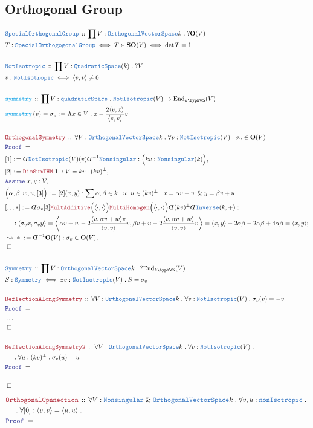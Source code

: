 \documentclass[12pt]{scrartcl}%
\newcommand{\TYPE}[1]{\textcolor{NavyBlue}{\mathtt{#1}}}%
\newcommand{\FUNC}[1]{\textcolor{Cerulean}{\mathtt{#1}}}%
\newcommand{\LOGIC}[1]{\textcolor{Blue}{\mathtt{#1}}}%
\newcommand{\THM}[1]{\textcolor{Maroon}{\mathtt{#1}}}%
\renewcommand{\.}{\; . \;} %
\newcommand{\de}{: \kern 0.1pc =} %
\newcommand{\Act}[1]{\left( #1 \right)} %
\newcommand{\Theorem}[2]{& \THM{#1} \, :: \, #2 \\ & \Proof = \\ } %
\newcommand{\DeclareType}[2]{& \TYPE{#1} \, :: \, #2 \\}%
\newcommand{\DefineType}[3]{& #1 : \TYPE{#2} \iff #3 \\}%
\newcommand{\DefineNamedType}[4]{& #1 : \TYPE{#2} \iff #3 \iff #4 \\}%
\newcommand{\DeclareFunc}[2]{& \FUNC{#1} \, :: \, #2 \\}%
\newcommand{\DefineNamedFunc}[4]{&  \FUNC{#1}\Act{#2} = #3 \de #4 \\}%
\newcommand{\NewLine}{\\ & \kern 1pc}%
\newcommand{\Page}[1]{ \begin{align*} #1 \end{align*}  }%
\newcommand{ \bd }{ \ByDef }%
\newcommand{\NoProof}{ & \ldots \\ \EndProof}%
\renewcommand{\And}{\; \& \;}%
\newcommand{\End}{\mathrm{End}}%
\newcommand{\Say}[3]{& #1 \de #2 : #3, \\} %
\newcommand{\Conclude}[3]{& #1 \de #2 : #3; \\}%
\newcommand{\Derive}[3]{& \leadsto #1 \de #2 : #3, \\} %
\newcommand{\Assume}[2]{& \LOGIC{Assume} \; #1 : #2, \\} %
\newcommand{\QED}{\; \square} %
\newcommand{\EndProof}{& \QED \\} %
\newcommand{\ByDef}{\rotatebox[origin=c]{-180}{$D$}}%
\newcommand{\Proof}{\LOGIC{Proof} \; } %
\newcommand{\SO}{\mathbf{SO}}
\newcommand{\OVS}{\TYPE{OrthogonalVectorSpace}}
\newcommand{\VS}[1]{#1\hyph\mathsf{VS}} %
\renewcommand{\O}{\mathbf{O}}
\begin{document}
\subsection{Orthogonal Group}
\Page{
	\DeclareType{SpecialOrthogonalGroup}{ \prod V : \OVS{k} \.  ?\O(V)  }
	\DefineNamedType{T}{SpecialOrthogogonalGroup}{T \in \SO(V)}{\det T = 1} 
	\\
	\DeclareType{NotIsotropic}{\prod V : \TYPE{QuadraticSpace}(k) \. ?V}
	\DefineType{v}{NotIsotropic}{ \langle v, v \rangle \neq 0  }
	\\
	\DeclareFunc{symmetry}{\prod V : \TYPE{quadraticSpace} \. \TYPE{NotIsotropic}(V) \to \End_{\VS{k}}(V)}
	\DefineNamedFunc{symmetry}{v}{\sigma_v}{\Lambda x \in V \. x -  \frac{2\langle v,x \rangle}{\langle v,v\rangle}v}
	\\
	\Theorem{OrthogonalSymmetry}{\forall V : \OVS{k} \. \forall v : \TYPE{NotIsotropic}(V) \. \sigma_v \in \O(V) }
	\Say{[1]}{\bd \TYPE{NotIsotropic}(V)(v)\bd^{-1}\TYPE{Nonsingular}}{\Big( kv : \TYPE{Nonsingular}(k)  \Big)}
	\Say{[2]}{\THM{DimSumTHM}[1]}{ V = kv \bot (kv)^\bot }
	\Assume{x,y}{V}
	\Say{\Big(\alpha,\beta,w,u,[3]\Big)}{[2](x,y)}{\sum \alpha,\beta \in k \. w,u \in (kv)^\bot \. x = \alpha v + w \And y = \beta v + u }
	\Conclude{[\ldots*]}{\bd \sigma_v[3]\THM{MultAdditive}\Big(\langle \cdot,\cdot \rangle\Big)\THM{MultiHomogen}\Big(\langle \cdot,\cdot \rangle\Big) \bd (kv)^\bot\bd \TYPE{Inverse}(k,+)}
	{
	     	\NewLine :
		\langle \sigma_v x, \sigma_v y \rangle = 
	     	\left\langle  \alpha v + w - 2\frac{\langle v, \alpha v + w \rangle v}{\langle v, v\rangle } v , 
	     	\beta v + u - 2\frac{\langle v, \alpha v + w \rangle  }{ \langle v, v \rangle } v \right\rangle =  
		\langle x,  y \rangle   -  2 \alpha\beta - 2 \alpha \beta + 4 \alpha \beta =
		\langle x, y \rangle 
	} 
	\Derive{[*]}{\bd^{-1} \O(V)}{ \sigma_v \in \O(V) }
	\EndProof
	\\
	\DeclareType{Symmetry}{\prod V : \OVS{k} \. ?\End_{\VS{k}}(V) }
	\DefineType{S}{Symmetry}{\exists v : \TYPE{NotIsotropic}(V) \. S = \sigma_v}
	\\
	\Theorem{ReflectionAlongSymmetry}{\forall V : \OVS{k} \. \forall v : \TYPE{NotIsotropic}(V) \.  \sigma_v(v) = -v }
	\NoProof
	\\
	\Theorem{ReflectionAlongSymmetry2}{\forall V : \OVS{k} \. \forall v : \TYPE{NotIsotropic}(V) \.  \NewLine \. \forall u : (kv)^\bot \. \sigma_v(u) = u }
	\NoProof
}\Page{	
	\Theorem{OrthogonalCpnnection}
	{
		\forall V : \TYPE{Nonsingular} \And \OVS{k} \. 
		\forall v,u : \TYPE{nonIsotropic} \.  \NewLine \. 
		\forall [0] : \langle v, v \rangle = \langle u, u \rangle \.
}}
\end{document}
